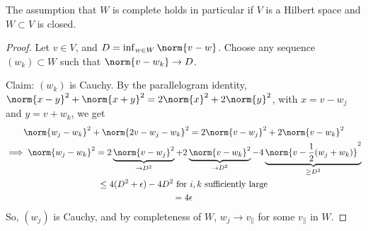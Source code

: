 \documentclass{article}
\begin{document}
The assumption that $W$ is complete holds in particular if $V$ is a Hilbert space and $W \subset V$ is closed.

\begin{proof}
    Let $v \in V$, and $D = \inf_{w \in W} \norm{v - w}$. Choose any sequence $(w_k) \subset W$ such that $\norm{v - w_k} \to D$.

    Claim: $(w_k)$ is Cauchy.
    By the parallelogram identity, $\norm{x - y}^2 + \norm{x+y}^2 = 2 \norm{x}^2 + 2 \norm{y}^2$, with $x = v-w_j$ and $y = v+w_k$, we get
    \begin{gather}
        \norm{w_j - w_k}^2 + \norm{2v - w_j - w_k}^2 = 2 \norm{v - w_j}^2 + 2 \norm{v - w_k}^2 \\
        \implies \norm{w_j - w_k}^2 = 2 \underbrace{\norm{v - w_j}^2}_{\to D^2} + 2 \underbrace{\norm{v - w_k}^2}_{\to D^2} - 4 \underbrace{\norm{v - \frac{1}{2}(w_j + w_k)}^2}_{\geq D^2} \\
        \leq 4(D^2 + \epsilon) - 4D^2 \text{ for $i, k$ sufficiently large} \\
        = 4\epsilon
    \end{gather}
    So, $(w_j)$ is Cauchy, and by completeness of $W$, $w_j \to v_\parallel$ for some $v_\parallel$ in $W$.
\end{proof}
\end{document}

